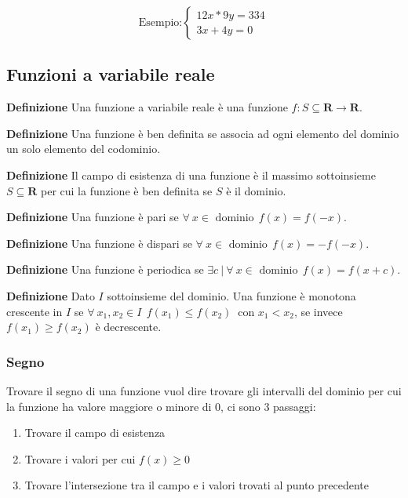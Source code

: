 \documentclass{article}
\begin{document}
\[
\text{Esempio:} 
\begin{cases}
12x*9y=334\\
3x+4y=0 
\end{cases}
\]\newline

\subsection{Funzioni a variabile reale}

\textbf{Definizione} Una funzione a variabile reale è una funzione  $f:S\subseteq\mathbf{R}\rightarrow\mathbf{R}$.\newline

\noindent\textbf{Definizione} Una funzione è ben definita se associa ad ogni elemento del dominio un solo elemento del codominio.\newline

\noindent\textbf{Definizione} Il campo di esistenza di una funzione è il massimo sottoinsieme $S\subseteq\mathbf{R}$ per cui la funzione è ben definita se $S$ è il dominio.\newline

\noindent\textbf{Definizione} Una funzione è pari se $\forall\ x\in\text{ dominio}\ \ f(x)=f(-x)$.\newline

\noindent\textbf{Definizione} Una funzione è dispari se $\forall\ x\in\text{ dominio}\ \ f(x)=-f(-x)$.\newline

\noindent\textbf{Definizione} Una funzione è periodica se $\exists c\ |\ \forall\ x\in\text{ dominio}\ \ f(x)=f(x+c)$.\newline

\noindent\textbf{Definizione} Dato $I$ sottoinsieme del dominio. Una funzione è monotona crescente in $I$ se $\forall\ x_1,x_2\in I\ \ f(x_1)\leq f(x_2)\ \text{ con }x_1<x_2$, se invece $f(x_1)\geq f(x_2)$ è decrescente.

\subsubsection{Segno}

Trovare il segno di una funzione vuol dire trovare gli intervalli del dominio per cui la funzione ha valore maggiore o minore di 0, ci sono 3 passaggi:
\begin{enumerate}
    \item Trovare il campo di esistenza
    \item Trovare i valori per cui $f(x)\geq0$
    \item Trovare l'intersezione tra il campo e i valori trovati al punto precedente
\end{enumerate}
\end{document}

